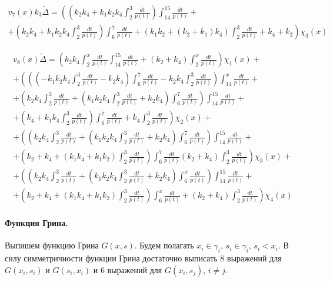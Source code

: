 \documentclass[a4paper,12pt]{article} %
\begin{document}
\begin{multline}
	{v_7(x)}k_3{\tilde{\Delta}}=
	\left(
		\left( k_2 k_4+k_1 k_2 k_4 \int_{2}^{3}\frac{dt}{p(t)}\right)  \int_{14}^{15}\frac{dt}{p(t)}
		\right. +\\+ \left.
		\left( k_2 k_4+k_1 k_2 k_4 \int_{2}^{3}\frac{dt}{p(t)}\right)  \int_{6}^{7}\frac{dt}{p(t)}+\left( k_1 k_2+\left( k_2+k_1\right)  k_4\right)  \int_{2}^{3}\frac{dt}{p(t)}+k_4+k_2
	\right)\chi_3(x)
\end{multline}


\begin{multline}
	{v_8(x)}{\tilde{\Delta}}=
	\left(
		k_2 k_4 \int_{2}^{x}\frac{dt}{p(t)} \int_{14}^{15}\frac{dt}{p(t)}+\left( k_2+k_4\right)  \int_{2}^{x}\frac{dt}{p(t)}
	\right)\chi_1(x)
	+\\+
	\left(
		\left( \left( -k_1 k_2 k_4 \int_{2}^{3}\frac{dt}{p(t)}-k_2 k_4\right)  \int_{6}^{7}\frac{dt}{p(t)}-k_2 k_4 \int_{2}^{3}\frac{dt}{p(t)}\right)  \int_{14}^{x}\frac{dt}{p(t)}
		\right. +\\+ \left.
		\left( k_2 k_4 \int_{2}^{3}\frac{dt}{p(t)}+\left( k_1 k_2 k_4 \int_{2}^{3}\frac{dt}{p(t)}+k_2 k_4\right)  \int_{6}^{7}\frac{dt}{p(t)}\right)  \int_{14}^{15}\frac{dt}{p(t)}
		\right. +\\+ \left.
		\left( k_4+k_1 k_4 \int_{2}^{3}\frac{dt}{p(t)}\right)  \int_{6}^{7}\frac{dt}{p(t)}+k_4 \int_{2}^{3}\frac{dt}{p(t)}
	\right)\chi_2(x)
	+\\+
	\left(
		\left( k_2 k_4 \int_{2}^{3}\frac{dt}{p(t)}+\left( k_1 k_2 k_4 \int_{2}^{3}\frac{dt}{p(t)}+k_2 k_4\right)  \int_{6}^{7}\frac{dt}{p(t)}\right)  \int_{14}^{15}\frac{dt}{p(t)}
		\right. +\\+ \left.
		\left( k_2+k_4+\left( k_1 k_4+k_1 k_2\right)  \int_{2}^{3}\frac{dt}{p(t)}\right)  \int_{6}^{7}\frac{dt}{p(t)}
		\left( k_2+k_4\right)  \int_{2}^{3}\frac{dt}{p(t)}
	\right)\chi_3(x)
	+\\+
	\left(
		\left( k_2 k_4 \int_{2}^{3}\frac{dt}{p(t)}+\left( k_1 k_2 k_4 \int_{2}^{3}\frac{dt}{p(t)}+k_2 k_4\right)  \int_{6}^{x}\frac{dt}{p(t)}\right)  \int_{14}^{15}\frac{dt}{p(t)}
		\right. +\\+ \left.
		\left( k_2+k_4+\left( k_1 k_4+k_1 k_2\right)  \int_{2}^{3}\frac{dt}{p(t)}\right)  \int_{6}^{x}\frac{dt}{p(t)}+\left( k_2+k_4\right)  \int_{2}^{3}\frac{dt}{p(t)}
	\right)\chi_4(x)
\end{multline}

\paragraph{Функция Грина.}
Выпишем функцию Грина $G(x,s)$.
Будем полагать $x_i\in\gamma_i$, $s_i\in\gamma_i$, $s_i < x_i$.
В силу симметричности функции Грина достаточно выписать 8 выражений для $G(x_i,s_i)$ и $G(s_i,x_i)$
и 6 выражений для $G(x_i,s_j)$, $i \neq j$.
\end{document}
